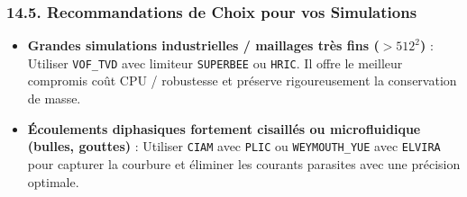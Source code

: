 \documentclass[
  french,
]{article}
\providecommand{\tightlist}{%
  \setlength{\itemsep}{0pt}\setlength{\parskip}{0pt}}
\begin{document}
\subsubsection{14.5. Recommandations de Choix pour vos
Simulations}\label{recommandations-de-choix-pour-vos-simulations}

\begin{itemize}
\tightlist
\item
  \textbf{Grandes simulations industrielles / maillages très fins
  (\(> 512^2\))} : Utiliser \texttt{VOF\_TVD} avec limiteur
  \texttt{SUPERBEE} ou \texttt{HRIC}. Il offre le meilleur compromis
  coût CPU / robustesse et préserve rigoureusement la conservation de
  masse.
\item
  \textbf{Écoulements diphasiques fortement cisaillés ou microfluidique
  (bulles, gouttes)} : Utiliser \texttt{CIAM} avec \texttt{PLIC} ou
  \texttt{WEYMOUTH\_YUE} avec \texttt{ELVIRA} pour capturer la courbure
  et éliminer les courants parasites avec une précision optimale.
\end{itemize}
\end{document}
